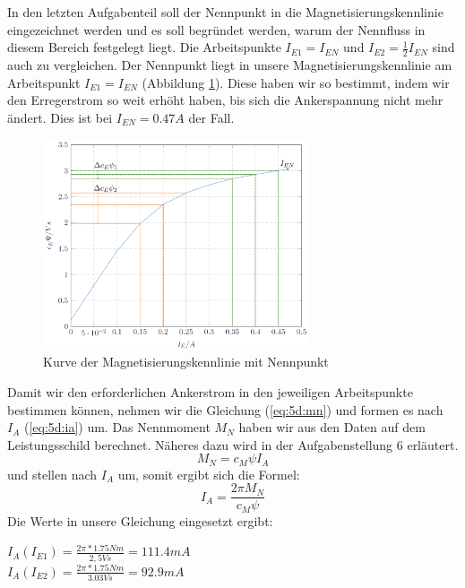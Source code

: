 \section{}
In den letzten Aufgabenteil soll der Nennpunkt in die Magnetisierungskennlinie eingezeichnet werden und es soll begründet werden, warum der Nennfluss in diesem Bereich festgelegt liegt. Die Arbeitspunkte $ I_{E1} = I_{EN} $ und $ I_{E2} = \frac{1}{2} I_{EN} $ sind auch zu vergleichen.
Der Nennpunkt liegt in unsere Magnetisierungskennlinie am Arbeitspunkt $ I_{E1} = I_{EN} $ (Abbildung \ref{fig:5d:kennlineNenn}). Diese haben wir so bestimmt, indem wir den Erregerstrom so weit erhöht haben, bis sich die Ankerspannung nicht mehr ändert. Dies ist bei $ I_{EN} = 0.47A $ der Fall.
\begin{figure}[h]
	\centering
	\includegraphics[width=0.7\textwidth]{./bilder/aufgabe4.png}
	\caption{Kurve der Magnetisierungskennlinie mit Nennpunkt}
	\label{fig:5d:kennlineNenn}
\end{figure}

Damit wir den erforderlichen Ankerstrom in den jeweiligen Arbeitspunkte bestimmen können, nehmen wir die Gleichung (\ref{eq:5d:mn}) und formen es nach $ I_{A} $ (\ref{eq:5d:ia}) um. Das Nennmoment $ M_{N} $ haben wir aus den Daten auf dem Leistungsschild berechnet. Näheres dazu wird in der Aufgabenstellung 6 erläutert.
\begin{equation}
	M_{N} = c_{M}\psi I_{A}
	\label{eq:5d:mn}
\end{equation} und stellen nach $ I_{A} $ um, somit ergibt sich die Formel:
\begin{equation}
	I_{A} = \frac{2\pi M_{N}}{c_{M}\psi}
	\label{eq:5d:ia}
\end{equation}
Die Werte in unsere Gleichung eingesetzt ergibt:
\begin{center}
	$ I_{A}(I_{E1}) = \frac{2\pi *1.75Nm}{2,5Vs} = 111.4mA $ \\
	$ I_{A}(I_{E2}) = \frac{2\pi *1.75Nm}{3.03Vs} = 92.9mA $
\end{center}

